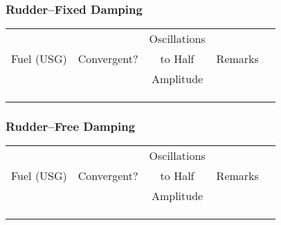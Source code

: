 % 
% 
%
\Large
\subsubsection*{Rudder--Fixed Damping}
  \settowidth{\colOne}{(USG)}
  \settowidth{\colTwo}{Convergent?}
  \settowidth{\colFour}{Remarks}

  \begin{tabularx}{\textwidth}{|c|c|c|lX|}
  \hline
   \multirow{3}{\colOne}{\centering Fuel (USG)}&\multirow{3}{\colTwo}{\centering Convergent?}&Oscillations&\multirow{3}{\colFour}{\centering Remarks}&\\
   &&to Half &&\\
   &&Amplitude&&\\
   \hline
   \hline
   &&&&\\
   \hline
   &&&&\\
   \hline
   &&&&\\
   \hline
   \end{tabularx}
  
\subsubsection*{Rudder--Free Damping}
  \begin{tabularx}{\textwidth}{|c|c|c|lX|}
  \hline
   \multirow{3}{\colOne}{\centering Fuel (USG)}&\multirow{3}{\colTwo}{\centering Convergent?}&Oscillations&\multirow{3}{\colFour}{\centering Remarks}&\\
   &&to Half &&\\
   &&Amplitude&&\\
   \hline
   \hline
   &&&&\\
   \hline
   &&&&\\
   \hline
   &&&&\\
   \hline
   \end{tabularx}
   \normalsize
  
  
  